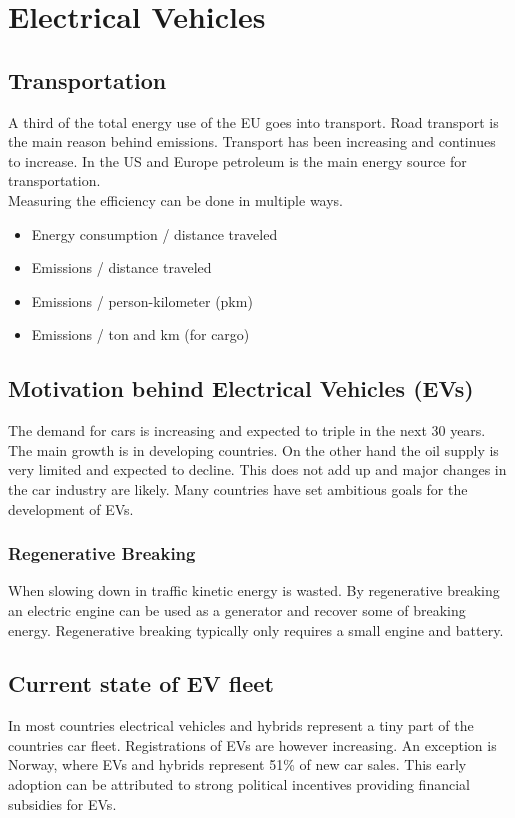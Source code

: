 \section{Electrical Vehicles}

\subsection{Transportation}
A third of the total energy use of the EU goes into transport.
Road transport is the main reason behind emissions.
Transport has been increasing and continues to increase.
In the US and Europe petroleum is the main energy source for transportation.\\

Measuring the efficiency can be done in multiple ways.

\begin{itemize}
    \item Energy consumption / distance traveled
    \item Emissions / distance traveled
    \item Emissions / person-kilometer (pkm)
    \item Emissions / ton and km (for cargo)
\end{itemize}

\subsection{Motivation behind Electrical Vehicles (EVs)}
The demand for cars is increasing and expected to triple in the next 30 years.
The main growth is in developing countries.
On the other hand the oil supply is very limited and expected to decline.
This does not add up and major changes in the car industry are likely.
Many countries have set ambitious goals for the development of EVs.

\subsubsection{Regenerative Breaking}
When slowing down in traffic kinetic energy is wasted.
By regenerative breaking an electric engine can be used as a generator and recover some of breaking energy.
Regenerative breaking typically only requires a small engine and battery.

\subsection{Current state of EV fleet}
In most countries electrical vehicles and hybrids represent a tiny part of the countries car fleet.
Registrations of EVs are however increasing.
An exception is Norway, where EVs and hybrids represent 51\% of new car sales.
This early adoption can be attributed to strong political incentives providing financial subsidies for EVs.


